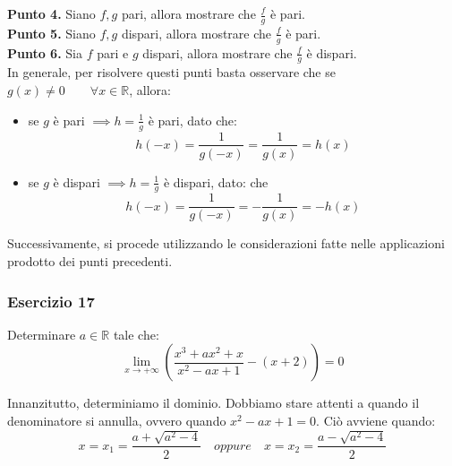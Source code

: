 \documentclass{article}
\begin{document}
\noindent\textbf{Punto 4.} Siano $f, g$ pari, allora mostrare che $\frac{f}{g}$ è pari. \\
\noindent\textbf{Punto 5.} Siano $f, g$ dispari, allora mostrare che $\frac{f}{g}$ è pari.\\
\noindent\textbf{Punto 6.} Sia $f$ pari e $g$ dispari, allora mostrare che $\frac{f}{g}$ è dispari.\\
In generale, per risolvere questi punti basta osservare che se $g(x) \neq 0 \qquad \forall x \in \mathbb{R}$, allora:
\begin{itemize}
    \item se $g$ è pari $\implies h = \frac{1}{g}$ è pari, dato che: $$h(-x) = \frac{1}{g(-x)} = \frac{1}{g(x)} = h(x)$$
    \item se $g$ è dispari $\implies h = \frac{1}{g}$ è dispari, dato: che $$h(-x) = \frac{1}{g(-x)} = -\frac{1}{g(x)} = -h(x)$$
\end{itemize}

\noindent Successivamente, si procede utilizzando le considerazioni fatte nelle applicazioni prodotto dei punti precedenti.

\subsubsection{Esercizio 17}
Determinare $a \in \mathbb{R}$ tale che:
\begin{equation*}
    \lim_{x \to +\infty} \left(\frac{x^3 + ax^2 + x}{x^2 - ax + 1} - (x + 2)\right) = 0
\end{equation*}

\noindent Innanzitutto, determiniamo il dominio. Dobbiamo stare attenti a quando il denominatore si annulla, ovvero quando $x^2 - ax + 1 = 0$. Ciò avviene quando:
\begin{equation*}
    x = x_1 = \frac{a + \sqrt{a^2 - 4}}{2} \quad oppure \quad x = x_2 = \frac{a - \sqrt{a^2 - 4}}{2}
\end{equation*}
\end{document}
